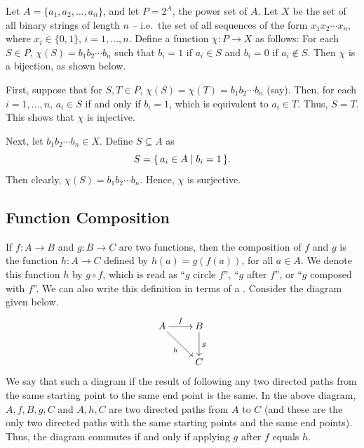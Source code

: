\begin{Example}
Let $A = \{a_1, a_2, \ldots, a_n\}$, and let $P = 2^A$, the power set of $A$. Let $X$ be the set of all binary strings of length $n$ -- i.e.\ the set of all sequences of the form $x_1 x_2 \cdots x_n$, where $x_i \in \{0, 1\}$, $i = 1, \ldots, n$. Define a function $\chi \colon P \to X$ as follows: For each $S \in P$, $\chi(S) = b_1 b_2 \cdots b_n$ such that $b_i = 1$ if $a_i \in S$ and $b_i = 0$ if $a_i \notin S$. Then $\chi$ is a bijection, as shown below.

First, suppose that for $S, T \in P$, $\chi(S) = \chi(T) = b_1 b_2 \cdots b_n$ (say). Then, for each $i = 1, \ldots, n$, $a_i \in S$ if and only if $b_i = 1$, which is equivalent to $a_i \in T$. Thus, $S = T$. This shows that $\chi$ is injective.

Next, let $b_1 b_2 \cdots b_n \in X$. Define $S \subseteq A$ as
\begin{equation*}
S = \qty{\, a_i \in A \mid b_i = 1 \,}.
\end{equation*}
Then clearly, $\chi(S) = b_1 b_2 \cdots b_n$. Hence, $\chi$ is surjective.
\end{Example}

\subsection{Function Composition}\label{subsec:FuncComp}

If $f \colon A \to B$ and $g \colon B \to C$ are two functions, then the composition of $f$ and $g$ is the function $h \colon A \to C$ defined by $h(a) = g(f(a))$, for all $a \in A$. We denote this function $h$ by $g \circ f$, which is read as ``$g$ circle $f$'', ``$g$ after $f$'', or ``$g$ composed with $f$''. We can also write this definition in terms of a . Consider the diagram given below.
\begin{equation*}
\xymatrix{
    A \ar[r]^f \ar[rd]_h & B \ar[d]^g \\
    & C
}
\end{equation*}
We say that such a diagram  if the result of following any two directed paths from the same starting point to the same end point is the same. In the above diagram, $A, f, B, g, C$ and $A, h, C$ are two directed paths from $A$ to $C$ (and these are the only two directed paths with the same starting points and the same end points). Thus, the diagram commutes if and only if applying $g$ after $f$ equals $h$.

